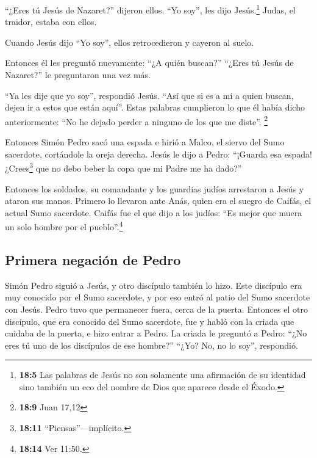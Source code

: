  ``¿Eres tú Jesús de Nazaret?'' dijeron ellos. ``Yo soy'',
les dijo Jesús.\footnote{\textbf{18:5} Las palabras de Jesús no son
  solamente una afirmación de su identidad sino también un eco del
  nombre de Dios que aparece desde el Éxodo.} Judas, el traidor, estaba
con ellos.

 Cuando Jesús dijo ``Yo soy'', ellos retrocedieron y
cayeron al suelo.

 Entonces él les preguntó nuevamente: ``¿A quién buscan?''
``¿Eres tú Jesús de Nazaret?'' le preguntaron una vez más.

 ``Ya les dije que yo soy'', respondió Jesús. ``Así que si
es a mí a quien buscan, dejen ir a estos que están aquí''.
 Estas palabras cumplieron lo que él había dicho
anteriormente: ``No he dejado perder a ninguno de los que me diste''.
\footnote{\textbf{18:9} Juan 17,12}

 Entonces Simón Pedro sacó una espada e hirió a Malco, el
siervo del Sumo sacerdote, cortándole la oreja derecha. 
Jesús le dijo a Pedro: ``¡Guarda esa espada! ¿Crees\footnote{\textbf{18:11}
  ``Piensas''---implícito.} que no debo beber la copa que mi Padre me ha
dado?''

 Entonces los soldados, su comandante y los guardias
judíos arrestaron a Jesús y ataron sus manos.  Primero lo
llevaron ante Anás, quien era el suegro de Caifás, el actual Sumo
sacerdote.  Caifás fue el que dijo a los judíos: ``Es
mejor que muera un solo hombre por el pueblo''.\footnote{\textbf{18:14}
  Ver 11:50.}

\hypertarget{primera-negaciuxf3n-de-pedro}{%
\subsection{Primera negación de
Pedro}\label{primera-negaciuxf3n-de-pedro}}

 Simón Pedro siguió a Jesús, y otro discípulo también lo
hizo. Este discípulo era muy conocido por el Sumo sacerdote, y por eso
entró al patio del Sumo sacerdote con Jesús.  Pedro tuvo
que permanecer fuera, cerca de la puerta. Entonces el otro discípulo,
que era conocido del Sumo sacerdote, fue y habló con la criada que
cuidaba de la puerta, e hizo entrar a Pedro.  La criada
le preguntó a Pedro: ``¿No eres tú uno de los discípulos de ese
hombre?'' ``¿Yo? No, no lo soy'', respondió.

